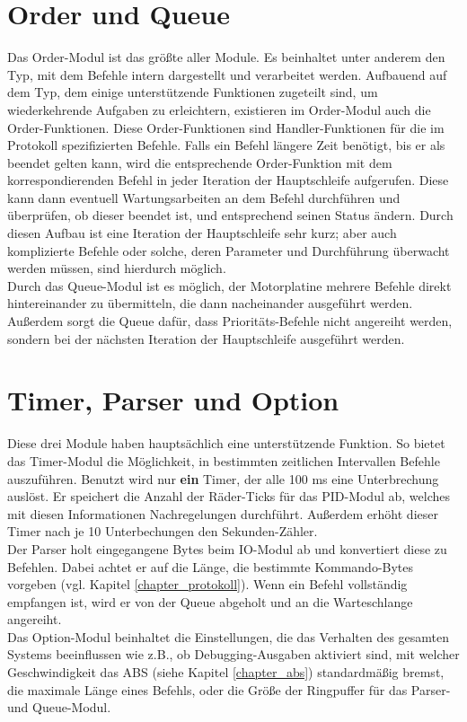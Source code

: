 \section{Order und Queue}
Das Order-Modul ist das größte aller Module. Es beinhaltet unter anderem den Typ, mit dem Befehle
intern dargestellt und verarbeitet werden. Aufbauend auf dem Typ, dem einige unterstützende
Funktionen zugeteilt sind, um wiederkehrende Aufgaben zu erleichtern, existieren im Order-Modul
auch die Order-Funktionen. Diese Order-Funktionen sind Handler-Funktionen für die
im Protokoll spezifizierten Befehle. Falls ein Befehl längere Zeit benötigt, bis er als beendet
gelten kann, wird die entsprechende Order-Funktion mit dem korrespondierenden Befehl in jeder
Iteration der Hauptschleife aufgerufen. Diese kann dann eventuell Wartungsarbeiten an dem
Befehl durchführen und überprüfen, ob dieser beendet ist, und entsprechend seinen Status ändern.
Durch diesen Aufbau ist eine Iteration der Hauptschleife sehr kurz; aber auch komplizierte Befehle
oder solche, deren Parameter und Durchführung überwacht werden müssen, sind hierdurch möglich.\\
Durch das Queue-Modul ist es möglich, der Motorplatine mehrere Befehle direkt hintereinander
zu übermitteln, die dann nacheinander ausgeführt werden. Außerdem sorgt die
Queue dafür, dass Prioritäts-Befehle nicht angereiht werden, sondern bei der nächsten
Iteration der Hauptschleife ausgeführt werden.
\section{Timer, Parser und Option}
Diese drei Module haben hauptsächlich eine unterstützende Funktion. So bietet das Timer-Modul
die Möglichkeit, in bestimmten zeitlichen Intervallen Befehle auszuführen. Benutzt wird
nur \textbf{ein} Timer, der alle 100 ms eine Unterbrechung auslöst. Er speichert die Anzahl
der Räder-Ticks für das PID-Modul ab, welches mit diesen Informationen Nachregelungen durchführt.
Außerdem erhöht dieser Timer nach je 10 Unterbechungen den Sekunden-Zähler.\\
Der Parser holt eingegangene Bytes beim IO-Modul ab und konvertiert diese zu Befehlen. Dabei
achtet er auf die Länge, die bestimmte Kommando-Bytes vorgeben (vgl. Kapitel \ref{chapter_protokoll}).
Wenn ein Befehl vollständig empfangen ist, wird er von der Queue abgeholt und an die Warteschlange angereiht.\\
Das Option-Modul beinhaltet die Einstellungen, die das Verhalten des gesamten Systems beeinflussen wie
z.B., ob Debugging-Ausgaben aktiviert sind, mit welcher Geschwindigkeit das ABS (siehe Kapitel \ref{chapter_abs})
standardmäßig bremst,
die maximale Länge eines Befehls, oder die Größe der Ringpuffer für das Parser- und Queue-Modul.

